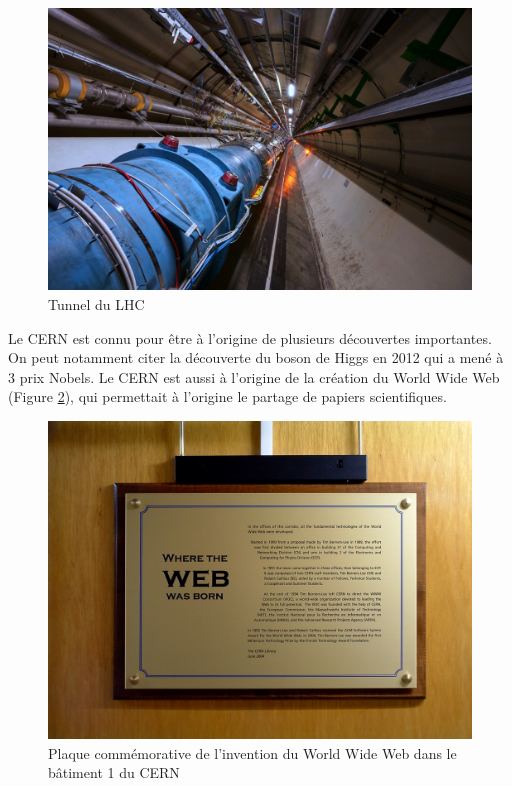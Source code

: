 \documentclass[a4paper]{report}
\begin{document}
\begin{figure}[!htb]
    \includegraphics[width=\textwidth, center]{LHC.jpg}
    \caption{Tunnel du LHC}
    \label{LHC}
\end{figure}

Le CERN est connu pour être à l'origine de plusieurs découvertes importantes.
On peut notamment citer la découverte du boson de Higgs en 2012 qui a mené à 3 prix Nobels.
Le CERN est aussi à l'origine de la création du World Wide Web (Figure \ref{WEB}), qui permettait à l'origine le partage de papiers scientifiques.

\begin{figure}[!htb]
    \includegraphics[width=\textwidth, center]{WEB.jpg}
    \caption{Plaque commémorative de l'invention du World Wide Web dans le bâtiment 1 du CERN}
    \label{WEB}
\end{figure}
\end{document}
